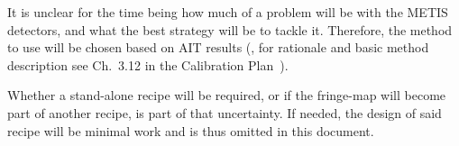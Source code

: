It is unclear for the time being how much of a problem will be with the METIS
detectors, and what the best strategy will be to tackle it. Therefore, the
method to use will be chosen based on AIT results (, for rationale and basic method description see Ch.~3.12 in the Calibration Plan~\cite{METIS-calibration_plan}).

Whether a stand-alone recipe will be required, or if the fringe-map will become
part of another recipe, is part of that uncertainty. If needed, the design of
said recipe will be minimal work and is thus omitted in this document.

